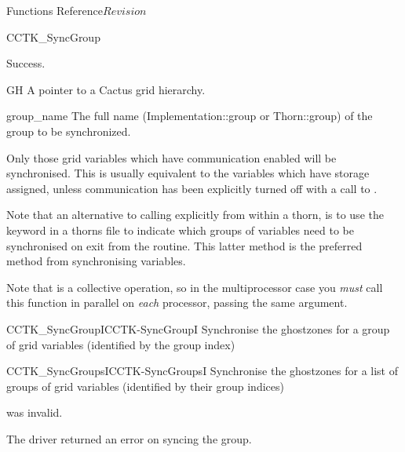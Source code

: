 \begin{cactuspart}{ Functions Reference}{}{$Revision$}
\begin{FunctionDescription}{CCTK\_SyncGroup}
\begin{ResultSection}
\begin{Result}{0}
Success.
\end{Result}
\end{ResultSection}

\begin{ParameterSection}
\begin{Parameter}{GH}
A pointer to a Cactus grid hierarchy.
\end{Parameter}
\begin{Parameter}{group\_name}
The full name (Implementation::group or Thorn::group) of the group
to be synchronized.
\end{Parameter}
\end{ParameterSection}

\begin{Discussion}
Only those grid variables which have communication enabled
will be synchronised. This is usually equivalent to the variables
which have storage assigned, unless communication has been explicitly
turned off with a call to .

Note that an alternative to calling  explicitly
from within a thorn, is to use the  keyword in a thorns
 file to indicate which groups of variables need
to be synchronised on exit from the routine. This latter method is
the preferred method from synchronising variables.

Note that  is a collective operation, so in the
multiprocessor case you {\em must\/} call this function in parallel on
{\em each\/} processor, passing the same  argument.
\end{Discussion}

\begin{SeeAlsoSection}
\begin{SeeAlso2}{CCTK\_SyncGroupI}{CCTK-SyncGroupI}
Synchronise the ghostzones for a group of grid variables
(identified by the group index)
\end{SeeAlso2}
\begin{SeeAlso2}{CCTK\_SyncGroupsI}{CCTK-SyncGroupsI}
Synchronise the ghostzones for a list of groups of grid variables
(identified by their group indices)
\end{SeeAlso2}
\end{SeeAlsoSection}

\begin{ErrorSection}
\begin{Error}{-1}
 was invalid.
\end{Error}
\begin{Error}{-2}
The driver returned an error on syncing the group.
\end{Error}
\end{ErrorSection}


\end{FunctionDescription}
\end{cactuspart}

